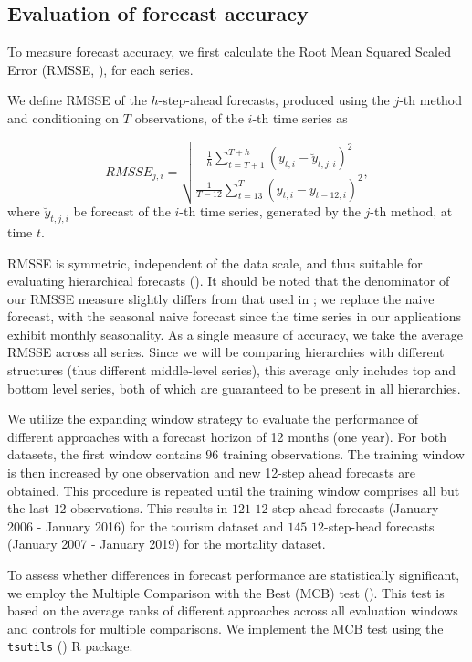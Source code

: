 \documentclass[a4paper,review,12pt,authoryear]{elsarticle}
\let\code=\texttt
\begin{document}
\subsection{Evaluation of forecast accuracy}
\label{subsec:evaluation}

To measure forecast accuracy, we first calculate the Root Mean Squared Scaled Error (RMSSE, \citealp{makridakisM5AccuracyCompetition2022}), for each series. {We define RMSSE of the $h$-step-ahead forecasts, produced using the $j$-th method and conditioning on $T$ observations, of the $i$-th time series as

\[
RMSSE_{j, i} = \sqrt{\frac{\frac{1}{h}\displaystyle\sum_{t=T+1}^{T+h}(y_{t, i}-\breve y_{t, j, i})^2}{\frac{1}{T-12}\displaystyle\sum_{t=13}^T (y_{t, i} - y_{t-12, i})^2}},
\]
where $\breve y_{t,j,i}$ be forecast of the $i$-th time series, generated by the $j$-th method, at time $t$.} RMSSE is symmetric, independent of the data scale, and thus suitable for evaluating hierarchical forecasts (\citealp{athanasopoulosEvaluationHierarchicalForecasts2023}). It should be noted that the denominator of our RMSSE measure slightly differs from that used in \cite{makridakisM5AccuracyCompetition2022}; we replace the naive forecast, with the seasonal naive forecast since the time series in our applications exhibit monthly seasonality. 
As a single measure of accuracy, we take the average RMSSE across all series. Since we will be comparing hierarchies with different structures (thus different middle-level series), this average only includes top and bottom level series, both of which are guaranteed to be present in all hierarchies.


We utilize the expanding window strategy to evaluate the performance of different approaches with a forecast horizon of 12 months (one year). For both datasets, the first window contains $96$ training observations. The training window is then increased by one observation and new 12-step ahead forecasts are obtained. This procedure is repeated until the training window comprises all but the  last $12$ observations. This results in $121$ $12$-step-ahead forecasts (January 2006 - January 2016) for the tourism dataset and $145$ $12$-step-head forecasts (January 2007 - January 2019) for the mortality dataset. 

To assess whether differences in forecast performance are statistically significant, we employ the Multiple Comparison with the Best (MCB) test (\citealp{koningM3CompetitionStatistical2005}). This test is based on the average ranks of different approaches across all evaluation windows and controls for multiple comparisons. { We implement the MCB test using the \code{tsutils} (\citealp{tsuitls}) R package}.
\end{document}
